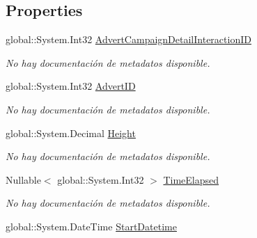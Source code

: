 \subsection*{Properties}
\begin{DoxyCompactItemize}
\item 
global\-::\-System.\-Int32 \hyperlink{class_game_memory_1_1_advert_campaign_detail_interactions_a15b79133fcb86178e994c495bb774593}{Advert\-Campaign\-Detail\-Interaction\-I\-D}
\begin{DoxyCompactList}\small\item\em No hay documentación de metadatos disponible. \end{DoxyCompactList}\item 
global\-::\-System.\-Int32 \hyperlink{class_game_memory_1_1_advert_campaign_detail_interactions_af8c6dda607a3613d809d451f988b3fbe}{Advert\-I\-D}
\begin{DoxyCompactList}\small\item\em No hay documentación de metadatos disponible. \end{DoxyCompactList}\item 
global\-::\-System.\-Decimal \hyperlink{class_game_memory_1_1_advert_campaign_detail_interactions_a10fb8d682b9d3fc999011bb92a2e44f5}{Height}
\begin{DoxyCompactList}\small\item\em No hay documentación de metadatos disponible. \end{DoxyCompactList}\item 
Nullable$<$ global\-::\-System.\-Int32 $>$ \hyperlink{class_game_memory_1_1_advert_campaign_detail_interactions_ae756a263996a18752f44e5928792bf7a}{Time\-Elapsed}
\begin{DoxyCompactList}\small\item\em No hay documentación de metadatos disponible. \end{DoxyCompactList}\item 
global\-::\-System.\-Date\-Time \hyperlink{class_game_memory_1_1_advert_campaign_detail_interactions_a2c4b07307a18acd8fbeb59159b8db65e}{Start\-Datetime}

\end{DoxyCompactItemize}
